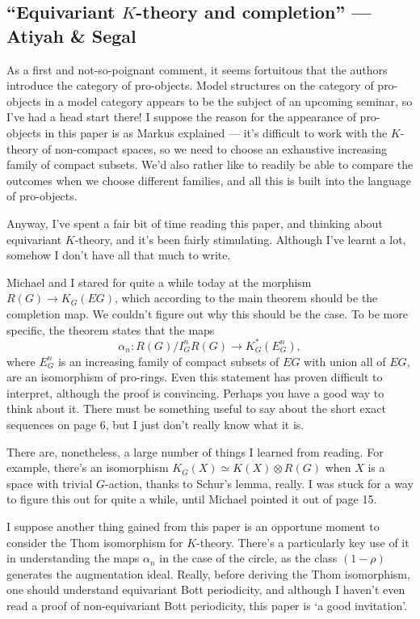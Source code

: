 \documentclass[11pt]{article}
\newcommand{\KanSemResponse}[1]
{
\thispagestyle{fancy}
\subsection*{#1}
}
\begin{document}
\begin{AtiyahSegalEqKthy}
\KanSemResponse
{``Equivariant $K$-theory and completion'' --- Atiyah \& Segal}
As a first and not-so-poignant comment, it seems fortuitous that the authors introduce the category of pro-objects. Model structures on the category of pro-objects in a model category appears to be the subject of an upcoming seminar, so I've had a head start there! I suppose the reason for the appearance of pro-objects in this paper is as Markus explained --- it's difficult to work with the $K$-theory of non-compact spaces, so we need to choose an exhaustive increasing family of compact subsets. We'd also rather like to readily be able to compare the outcomes when we choose different families, and all this is built into the language of pro-objects.

Anyway, I've spent a fair bit of time reading this paper, and thinking about equivariant $K$-theory, and it's been fairly stimulating. Although I've learnt a lot, somehow I don't have all that much to write.

Michael and I stared for quite a while today at the morphism $R(G)\to K_G(EG)$, which according to the main theorem should be the completion map. We couldn't figure out why this should be the case. To be more specific, the theorem states that the maps
\[\alpha_n: R(G)/I_G^n R(G)\to K^*_G(E_G^n),\]
where $E_G^n$ is an increasing family of compact subsets of $EG$ with union all of $EG$, are an isomorphism of pro-rings. Even this statement has proven difficult to interpret, although the proof is convincing. Perhaps you have a good way to think about it. There must be something useful to say about the short exact sequences on page 6, but I just don't really know what it is.

There are, nonetheless, a large number of things I learned from reading. For example, there's an isomorphism $K_G(X)\simeq K(X)\otimes R(G)$ when $X$ is a space with trivial $G$-action, thanks to Schur's lemma, really. I was stuck for a way to figure this out for quite a while, until Michael pointed it out of page 15.

I suppose another thing gained from this paper is an opportune moment to consider the Thom isomorphism for $K$-theory. There's a particularly key use of it in understanding the maps $\alpha_n$ in the case of the circle, as the class $(1-\rho)$ generates the augmentation ideal. Really, before deriving the Thom isomorphism, one should understand equivariant Bott periodicity, and although I haven't even read a proof of non-equivariant Bott periodicity, this paper is `a good invitation'.


\end{AtiyahSegalEqKthy}
\end{document}

